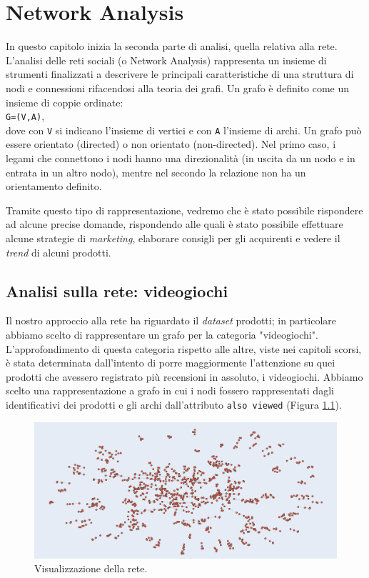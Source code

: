 \chapter{Network Analysis}
\label{cap:NetworkAnalysis}
	In questo capitolo inizia la seconda parte di analisi, quella relativa alla rete. L’analisi delle reti sociali (o Network Analysis) rappresenta un insieme di strumenti finalizzati a descrivere le principali caratteristiche di una struttura di nodi e connessioni rifacendosi alla teoria dei grafi. Un grafo è definito come un insieme di coppie ordinate: \\
	\verb|G=(V,A)|, \\
	dove con \verb|V| si indicano l'insieme di vertici e con \verb|A| l'insieme di archi. Un grafo può essere orientato (directed) o non orientato (non-directed). Nel primo caso, i legami che connettono i nodi hanno una direzionalità (in uscita da un nodo e in entrata in un altro nodo), mentre nel secondo la relazione non ha un orientamento definito. 
	
	Tramite questo tipo di rappresentazione, vedremo che è stato possibile rispondere ad alcune precise domande, rispondendo alle quali è stato possibile effettuare alcune strategie di \textit{marketing}, elaborare consigli per gli acquirenti e vedere il \textit{trend} di alcuni prodotti.   
	
	
	\section{Analisi sulla rete: videogiochi}
		Il nostro approccio alla rete ha riguardato il \textit{dataset} prodotti; in particolare abbiamo scelto di rappresentare un grafo per la categoria "videogiochi". L'approfondimento di questa categoria rispetto alle altre, viste nei capitoli scorsi, è stata determinata dall'intento di porre maggiormente l'attenzione su quei prodotti che avessero registrato più recensioni in assoluto, i videogiochi. Abbiamo scelto una rappresentazione a grafo in cui i nodi fossero rappresentati dagli identificativi dei prodotti e gli archi dall'attributo \verb|also viewed| (Figura \ref{fig:network}).  
		
		\begin{figure} [h]
			\includegraphics[width=\textwidth]{Figure/network}
			\caption{Visualizzazione della rete.}
			\label{fig:network}
		\end{figure}
		
